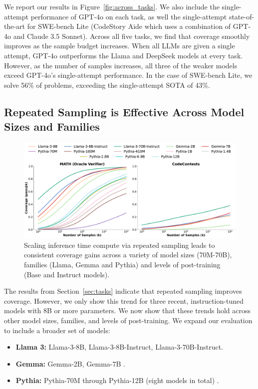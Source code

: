 \documentclass[11pt]{article}
\begin{document}
We report our results in Figure~\ref{fig:across_tasks}. We also include the single-attempt performance of GPT-4o on each task, as well the single-attempt state-of-the-art for SWE-bench Lite (CodeStory Aide \cite{aide} which uses a combination of GPT-4o and Claude 3.5 Sonnet). Across all five tasks, we find that coverage smoothly improves as the sample budget increases. When all LLMs are given a single attempt, GPT-4o outperforms the Llama and DeepSeek models at every task. However, as the number of samples increases, all three of the weaker models exceed GPT-4o's single-attempt performance. In the case of SWE-bench Lite, we solve 56\% of problems, exceeding the single-attempt SOTA of 43\%. 

\subsection{Repeated Sampling is Effective Across Model Sizes and Families}
\label{sec:models}

\begin{figure}
    \centering
    \includegraphics[width=\textwidth]{figures/all_model_scaling.pdf}
    \caption{Scaling inference time compute via repeated sampling leads to consistent coverage gains across a variety of model sizes (70M-70B), families (Llama, Gemma and Pythia) and levels of post-training (Base and Instruct models). }
    \label{fig:across_models}
\end{figure}

The results from Section~\ref{sec:tasks} indicate that repeated sampling improves coverage. However, we only show this trend for three recent, instruction-tuned models with 8B or more parameters. We now show that these trends hold across other model sizes, families, and levels of post-training. We expand our evaluation to include a broader set of models:

\begin{itemize}
    \item \textbf{Llama 3:} Llama-3-8B, Llama-3-8B-Instruct, Llama-3-70B-Instruct.
    \item \textbf{Gemma:} Gemma-2B, Gemma-7B \cite{gemmateam2024gemmaopenmodelsbased}.
    \item \textbf{Pythia:} Pythia-70M through Pythia-12B (eight models in total) \cite{biderman2023pythiasuiteanalyzinglarge}.
\end{itemize}
\end{document}
